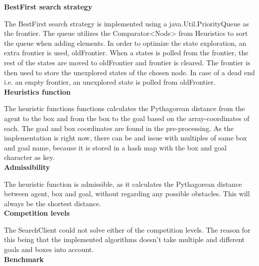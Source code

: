 \documentclass[Main]{subfiles}
\begin{document}
\textbf{BestFirst search strategy}

The BestFirst search strategy is implemented using a java.Util.PriorityQueue as the frontier. The queue utilizes the Comparator<Node> from Heuristics to sort the queue when adding elements. 
In order to optimize the state exploration, an extra frontier is used, oldFrontier. When a states is polled from the frontier, the rest of the states are moved to oldFrontier and frontier is cleared. The frontier is then used to store the unexplored states of the chosen node. In case of a dead end i.e. an empty frontier, an unexplored state is polled from oldFrontier. 
\\

\textbf{Heuristics function}

The heuristic functions functions calculates the Pythagorean distance from the agent to the box and from the box to the goal based on the array-coordinates of each. The goal and box coordinates are found in the pre-processing. 
As the implementation is right now, there can be and issue with multiples of same box and goal name, because it is stored in a hash map with the box and goal character as key.
\\

\textbf{Admissibility}

The heuristic function is admissible, as it calculates the Pythagorean distance between agent, box and goal, without regarding any possible obstacles. This will always be the shortest distance. 
\\

\textbf{Competition levels}

The SearchClient could not solve either of the competition levels. The reason for this being that the implemented algorithms doesn't take multiple and different goals and boxes into account.
\\

\textbf{Benchmark}
\end{document}
